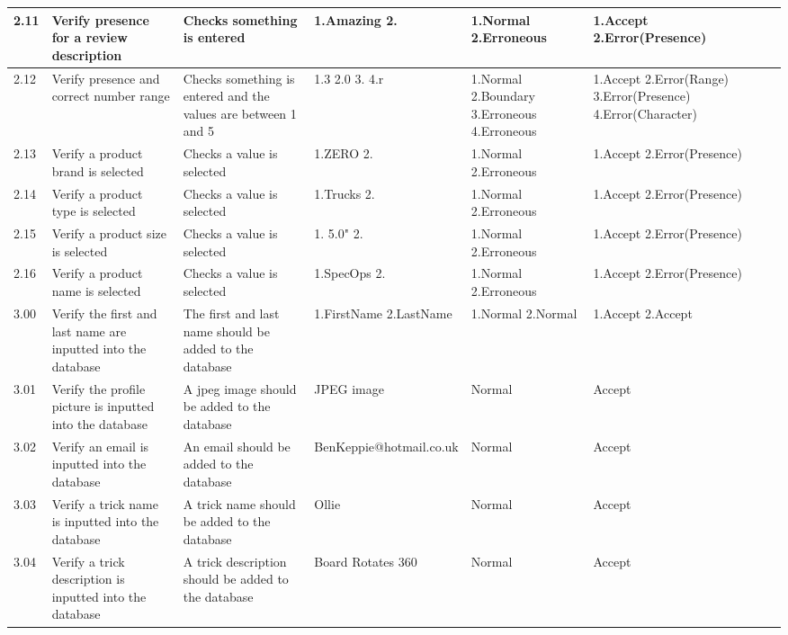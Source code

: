 \begin{landscape}
\begin{center}
\begin{longtable}{|p{1.5cm}|p{2.5cm}|p{2.5cm}|p{2cm}|p{2cm}|p{2cm}|p{2cm}|p{2cm}|}
2.11 & Verify presence for a review description & Checks something is entered & 1.Amazing 2. & 1.Normal 2.Erroneous & 1.Accept 2.Error(Presence) & & \\ \hline

2.12 & Verify presence and correct number range & Checks something is entered and the values are between 1 and 5 & 1.3 2.0 3. 4.r & 1.Normal 2.Boundary 3.Erroneous 4.Erroneous & 1.Accept 2.Error(Range) 3.Error(Presence) 4.Error(Character) & & \\ \hline

2.13 & Verify a product brand is selected & Checks a value is selected & 1.ZERO 2. & 1.Normal 2.Erroneous & 1.Accept 2.Error(Presence) & & \\ \hline

2.14 & Verify a product type is selected & Checks a value is selected & 1.Trucks 2. & 1.Normal 2.Erroneous & 1.Accept 2.Error(Presence) & & \\ \hline

2.15 & Verify a product size is selected & Checks a value is selected & 1. 5.0" 2. & 1.Normal 2.Erroneous & 1.Accept 2.Error(Presence) & & \\ \hline

2.16 & Verify a product name is selected & Checks a value is selected & 1.SpecOps 2. & 1.Normal 2.Erroneous & 1.Accept 2.Error(Presence) & & \\ \hline



3.00 & Verify the first and last name are inputted into the database & The first and last name should be added to the database & 1.FirstName 2.LastName & 1.Normal 2.Normal & 1.Accept 2.Accept & &  \\ \hline

3.01 & Verify the profile picture is inputted into the database & A jpeg image should be added to the database & JPEG image & Normal & Accept & & \\ \hline

3.02 & Verify an email is inputted into the database & An email should be added to the database & BenKeppie@hotmail.co.uk & Normal & Accept  & & \\ \hline

3.03 & Verify a trick name is inputted into the database & A trick name should be added to the database & Ollie & Normal & Accept & & \\ \hline

3.04 & Verify a trick description is inputted into the database & A trick description should be added to the database & Board Rotates 360 & Normal & Accept & & \\ \hline


\end{longtable}
\end{center}
\end{landscape}
